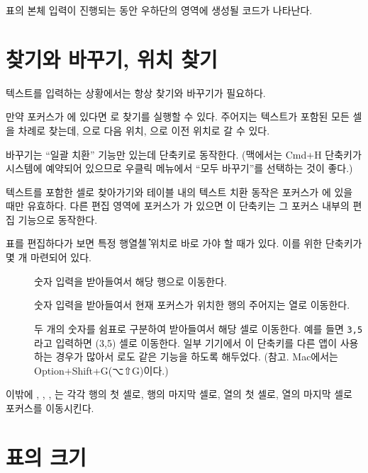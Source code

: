 \documentclass{simplman}
\newcommand*\guielem[1]{\colorbox{blue8!20}{\sffamily[#1]}}
\begin{document}
표의 본체 입력이 진행되는 동안 우하단의 \guielem{LaTeX 코드 미리보기} 영역에 생성될 코드가 나타난다.

\section{찾기와 바꾸기, 위치 찾기}

텍스트를 입력하는 상황에서는 항상 찾기와 바꾸기가 필요하다. 

만약 포커스가 \guielem{테이블 영역}에 있다면 로 찾기를 실행할 수 있다. 주어지는 텍스트가 포함된 모든 셀을 차례로 찾는데, 으로 다음 위치, 으로 이전 위치로 갈 수 있다.

바꾸기는 ``일괄 치환'' 기능만 있는데  단축키로 동작한다. (맥에서는 Cmd+H 단축키가 시스템에 예약되어 있으므로 우클릭 메뉴에서 ``모두 바꾸기''를 선택하는 것이 좋다.)

\begin{Chamgo}
텍스트를 포함한 셀로 찾아가기와 테이블 내의 텍스트 치환 동작은 포커스가 \guielem{테이블 영역}에 있을 때만 유효하다. 다른 편집 영역에 포커스가 가 있으면 이 단축키는 그 포커스 내부의 편집 기능으로 동작한다.
\end{Chamgo}

표를 편집하다가 보면 특정 행\.열\.셀 위치로 바로 가야 할 때가 있다. 이를 위한 단축키가 몇 개 마련되어 있다.
\begin{description}
\item [{}] 숫자 입력을 받아들여서 해당 행으로 이동한다.
\item [{}] 숫자 입력을 받아들여서 현재 포커스가 위치한 행의 주어지는 열로 이동한다.
\item [{}] 두 개의 숫자를 쉼표로 구분하여 받아들여서 해당 셀로 이동한다. 예를 들면 \texttt{3,5}라고 입력하면 (3,5) 셀로 이동한다. 일부 기기에서 이 단축키를 다른 앱이 사용하는 경우가 많아서 로도 같은 기능을 하도록 해두었다. (참고. Mac에서는 Option+Shift+G({⌥⇧}G)이다.)
\end{description}

\noindent 
이밖에 , , , 는 각각 행의 첫 셀로, 행의 마지막 셀로, 열의 첫 셀로, 열의 마지막 셀로 포커스를 이동시킨다.

\section{표의 크기}
\end{document}
